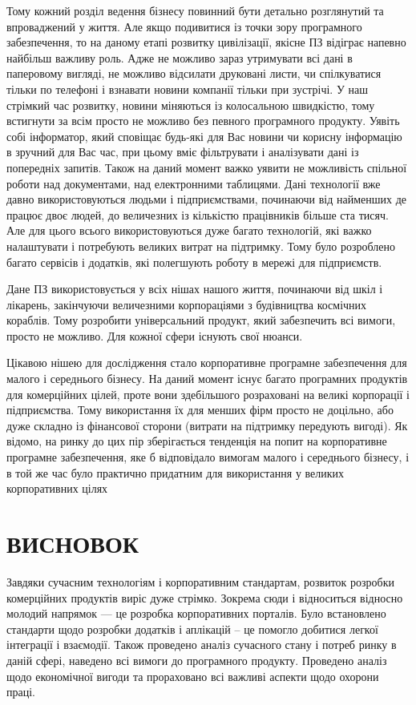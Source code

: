 Тому кожний розділ ведення бізнесу повинний бути детально розглянутий та впроваджений у життя. 
Але якщо подивитися із точки зору програмного забезпечення, то на даному етапі розвитку цивілізації, якісне ПЗ відіграє напевно найбільш важливу роль. 
Адже не можливо зараз утримувати всі дані в паперовому вигляді, не можливо відсилати друковані листи, чи спілкуватися тільки по телефоні і взнавати новини компанії тільки при зустрічі. 
У наш стрімкий час розвитку, новини міняються із колосальною швидкістю, тому встигнути за всім просто не можливо без певного програмного продукту. 
Уявіть собі інформатор, який сповіщає будь-які для Вас новини чи корисну інформацію в зручний для Вас час, при цьому вміє фільтрувати і аналізувати дані із попередніх запитів. 
Також на даний момент важко уявити не можливість спільної роботи над документами, над електронними таблицями. 
Дані технології вже давно використовуються людьми і підприємствами, починаючи від найменших де працює двоє людей, до величезних із кількістю працівників більше ста тисяч. 
Але для цього всього використовуються дуже багато технологій, які важко налаштувати і потребують великих витрат на підтримку.
Тому було розроблено багато сервісів і додатків, які полегшують роботу в мережі для підприємств.
\par Дане ПЗ використовується у всіх нішах нашого життя, починаючи від шкіл і лікарень, закінчуючи величезними корпораціями з будівництва космічних кораблів. 
Тому розробити універсальний продукт, який забезпечить всі вимоги, просто не можливо. 
Для кожної сфери існують свої нюанси.
\par Цікавою нішею для дослідження стало корпоративне програмне забезпечення для малого і середнього бізнесу.
 На даний момент існує багато програмних продуктів для комерційних цілей, проте вони здебільшого розраховані на великі корпорації і підприємства.
Тому використання їх для менших фірм просто не доцільно, або дуже складно із фінансової сторони (витрати на підтримку передують вигоді).
Як відомо, на ринку до цих пір зберігається тенденція на попит на корпоративне програмне забезпечення, яке б відповідало вимогам малого і середнього бізнесу, і в той же час було практично придатним для використання у великих корпоративних цілях



% 
% 




\section*{ВИСНОВОК}
Завдяки сучасним технологіям і корпоративним стандартам, розвиток розробки комерційних продуктів виріс дуже стрімко. 
Зокрема сюди і відноситься відносно молодий напрямок --- це розробка корпоративних порталів. 
Було встановлено стандарти щодо розробки додатків і аплікацій -- це помогло добитися легкої інтеграції і взаємодії. 
Також проведено аналіз сучасного стану і потреб ринку в даній сфері, наведено всі вимоги до програмного продукту.
Проведено аналіз щодо економічної вигоди та прораховано всі важливі аспекти щодо охорони праці.



